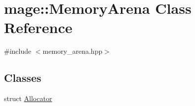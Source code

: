 \hypertarget{classmage_1_1_memory_arena}{}\section{mage\+:\+:Memory\+Arena Class Reference}
\label{classmage_1_1_memory_arena}


{\ttfamily \#include $<$memory\+\_\+arena.\+hpp$>$}

\subsection*{Classes}
\begin{DoxyCompactItemize}
\item 
struct \hyperlink{structmage_1_1_memory_arena_1_1_allocator}{Allocator}
\end{DoxyCompactItemize}
